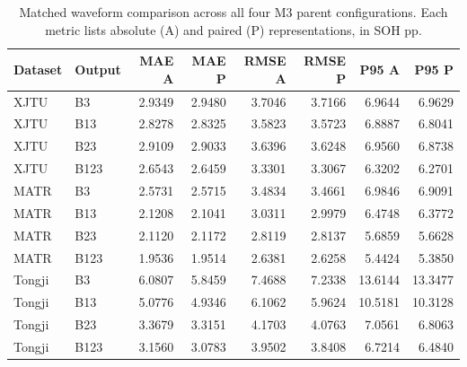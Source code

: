 \begin{table}[H]\centering
\caption{Matched waveform comparison across all four M3 parent configurations. Each metric lists absolute (A) and paired (P) representations, in SOH pp.}\label{tab:sm3all}
\papertablesize\setlength{\tabcolsep}{4pt}\renewcommand{\arraystretch}{1.15}
\begin{tabular}{llrrrrrr}\toprule
Dataset & Output & MAE A & MAE P & RMSE A & RMSE P & P95 A & P95 P \\ \midrule
XJTU & B3 & 2.9349 & 2.9480 & 3.7046 & 3.7166 & 6.9644 & 6.9629 \\
XJTU & B13 & 2.8278 & 2.8325 & 3.5823 & 3.5723 & 6.8887 & 6.8041 \\
XJTU & B23 & 2.9109 & 2.9033 & 3.6396 & 3.6248 & 6.9560 & 6.8738 \\
XJTU & B123 & 2.6543 & 2.6459 & 3.3301 & 3.3067 & 6.3202 & 6.2701 \\
MATR & B3 & 2.5731 & 2.5715 & 3.4834 & 3.4661 & 6.9846 & 6.9091 \\
MATR & B13 & 2.1208 & 2.1041 & 3.0311 & 2.9979 & 6.4748 & 6.3772 \\
MATR & B23 & 2.1120 & 2.1172 & 2.8119 & 2.8137 & 5.6859 & 5.6628 \\
MATR & B123 & 1.9536 & 1.9514 & 2.6381 & 2.6258 & 5.4424 & 5.3850 \\
Tongji & B3 & 6.0807 & 5.8459 & 7.4688 & 7.2338 & 13.6144 & 13.3477 \\
Tongji & B13 & 5.0776 & 4.9346 & 6.1062 & 5.9624 & 10.5181 & 10.3128 \\
Tongji & B23 & 3.3679 & 3.3151 & 4.1703 & 4.0763 & 7.0561 & 6.8063 \\
Tongji & B123 & 3.1560 & 3.0783 & 3.9502 & 3.8408 & 6.7214 & 6.4840 \\
\bottomrule\end{tabular}
\end{table}
